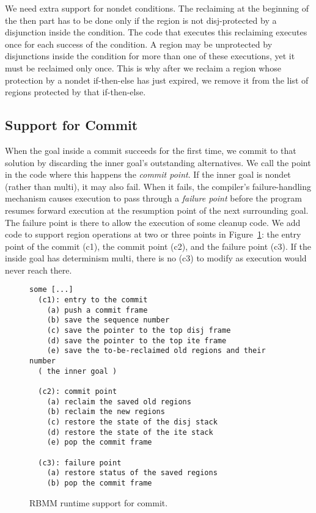 \documentclass{tlp}
\begin{document}
We need extra support for nondet conditions.
The reclaiming at the beginning of the then part
has to be done only if the region is not disj-protected
by a disjunction inside the condition.
The code that executes this reclaiming
executes once for each success of the condition.
A region may be unprotected by disjunctions inside the condition
for more than one of these executions, yet it must be reclaimed only once.
This is why after we reclaim a region
whose protection by a nondet if-then-else has just expired,
we remove it from the list of regions protected by that if-then-else.

\subsection{Support for Commit}
\label{seCsupportnondetCcommit}
When the goal inside a commit succeeds for the first time,
we commit to that solution by
discarding the inner goal's outstanding alternatives.
We call the point in the code where this happens the \emph{commit point}.
If the inner goal is nondet (rather than multi), it may also fail.
When it fails, the compiler's failure-handling mechanism
causes execution to pass through a \emph{failure point}
before the program resumes forward execution
at the resumption point of the next surrounding goal.
The failure point is there to allow the execution of some cleanup code.
We add code to support region operations at two or three points
in Figure~\ref{fig:supportcommit}:
the entry point of the commit (c1),
the commit point (c2),
and the failure point (c3).
If the inside goal has determinism multi,
there is no (c3) to modify as execution would never reach there.

\begin{figure}
\scriptsize
\begin{Verbatim}[frame=single,framerule=0.2pt,framesep=3pt]
some [...]
  (c1): entry to the commit
    (a) push a commit frame
    (b) save the sequence number
    (c) save the pointer to the top disj frame
    (d) save the pointer to the top ite frame
    (e) save the to-be-reclaimed old regions and their number
  ( the inner goal )

  (c2): commit point
    (a) reclaim the saved old regions
    (b) reclaim the new regions
    (c) restore the state of the disj stack
    (d) restore the state of the ite stack
    (e) pop the commit frame

  (c3): failure point
    (a) restore status of the saved regions
    (b) pop the commit frame
\end{Verbatim}
\small
\caption{RBMM runtime support for commit.}
\label{fig:supportcommit}
\normalsize
\end{figure}
\end{document}
